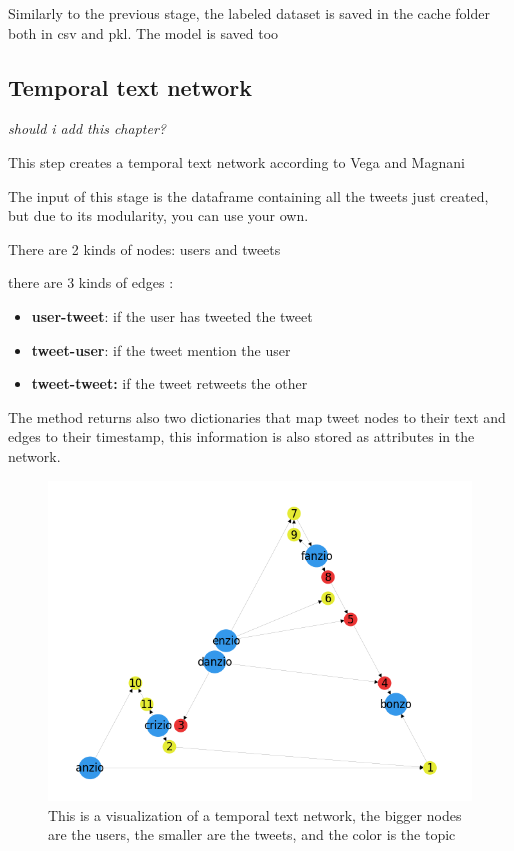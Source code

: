 Similarly to the previous stage, the labeled dataset is saved in the cache folder both in csv and pkl. The model is saved too

\subsection{Temporal text network}
\textit{should i add this chapter?}

This step creates a temporal text network according to Vega and Magnani \cite{vega_foundations_2018} 

The input of this stage is the dataframe containing all the tweets just created, but due to its modularity, you can use your own.

There are 2 kinds of nodes: users and tweets

there are 3 kinds of edges : 
\begin{itemize}
    \item \textbf{user-tweet}: if the user has tweeted the tweet
    \item  \textbf{tweet-user}: if the tweet mention the user
    \item \textbf{tweet-tweet:} if the tweet retweets the other
\end{itemize}


The method returns also two dictionaries that map tweet nodes to their text and edges to their timestamp, this information is also stored as attributes in the network.
\begin{figure}
    \centering
    \includegraphics[width=0.75\linewidth]{Chapter4/figures/full_network.png}
    \caption{This is a visualization of a temporal text network, the bigger nodes are the users, the smaller are the tweets, and the color is the topic}
    \label{fig:tt_network}
\end{figure}

